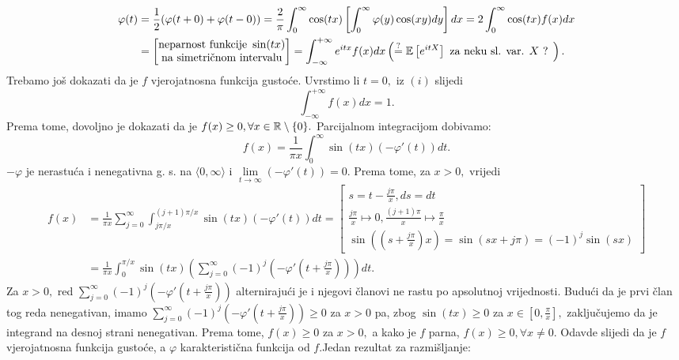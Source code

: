 \documentclass{article}
\begin{document}
\[\begin{aligned}\varphi(t)&=\frac12(\varphi(t+0)+\varphi(t-0))=\frac2\pi\int_0^\infty\cos(tx)\left[\int_0^\infty\varphi(y)\cos(xy)dy\right]dx=2\int_0^\infty\cos(tx)f(x)dx\\&=\begin{bmatrix}\text{neparnost funkcije }\sin(tx)\\\text{na simetričnom intervalu}\end{bmatrix}=\int_{-\infty}^{+\infty}e^{itx}f(x)dx\left(\overset{?}{=}\Bbb E\left[e^{itX}\right]\text{ za neku sl. var. }X\text{ ? }\right).\end{aligned}\] Trebamo još dokazati da je \(f\) vjerojatnosna funkcija gustoće. Uvrstimo li \(t=0,\) iz \((i)\) slijedi \[\int_{-\infty}^{+\infty}f(x)dx=1.\] Prema tome, dovoljno je dokazati  da je \(f(x)\ge0,\forall x\in\Bbb R\setminus\{0\}.\) Parcijalnom integracijom dobivamo: \[f(x)=\frac1{\pi x}\int_0^\infty\sin(tx)(-\varphi'(t))dt.\] \(-\varphi\) je nerastuća i nenegativna g. s. na \(\langle0,\infty\rangle\) i \(\lim\limits_{t\to\infty}(-\varphi'(t))=0.\) Prema tome, za \(x>0,\) vrijedi \[\begin{aligned}f(x)&=\frac1{\pi x}\sum_{j=0}^\infty\int_{j\pi/x}^{(j+1)\pi/x}\sin(tx)(-\varphi'(t))dt=\begin{bmatrix}s=t-\frac{j\pi}x, ds=dt\\\frac{j\pi}x\mapsto 0,\frac{(j+1)\pi}x\mapsto\frac{\pi}x\\\sin\left(\left(s+\frac{j\pi}x\right)x\right)=\sin(sx+j\pi)=(-1)^j\sin(sx)\end{bmatrix}\\&=\frac1{\pi x}\int_0^{\pi/x}\sin(tx)\left(\sum_{j=0}^\infty(-1)^j\left(-\varphi'\left(t+\frac{j\pi}x\right)\right)\right)dt.\end{aligned}\] Za \(x>0,\) red \(\displaystyle \sum_{j=0}^\infty(-1)^j\left(-\varphi'\left(t+\frac{j\pi}x\right)\right)\) alternirajući je i njegovi članovi ne rastu po apsolutnoj vrijednosti. Budući da je prvi član tog reda nenegativan, imamo  \(\displaystyle\sum_{j=0}^\infty(-1)^j\left(-\varphi'\left(t+\frac{j\pi}x\right)\right)\ge0\) za \(x>0\) pa, zbog \(\sin(tx)\ge 0\) za \(x\in\left[0,\frac{\pi}x\right],\) zaključujemo da je integrand na desnoj strani nenegativan. Prema tome, \(f(x)\ge0\) za \(x>0,\) a kako je \(f\) parna, \(f(x)\ge0,\forall x\ne0.\) Odavde slijedi da je \(f\) vjerojatnosna funkcija gustoće, a \(\varphi\) karakteristična funkcija od \(f.\)\newline\newline Jedan rezultat za razmišljanje:\newline
\end{document}
